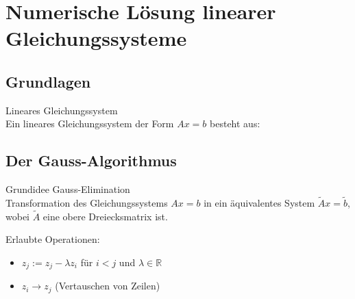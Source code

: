 \section{Numerische Lösung linearer Gleichungssysteme}

\subsection{Grundlagen}

\begin{concept}{Lineares Gleichungssystem}\\
Ein lineares Gleichungssystem der Form $Ax = b$ besteht aus:
\vspace{2mm}\\
\end{concept}

\subsection{Der Gauss-Algorithmus}

\begin{concept}{Grundidee Gauss-Elimination}\\
Transformation des Gleichungssystems $Ax=b$ in ein äquivalentes System $\tilde{A}x=\tilde{b}$, wobei $\tilde{A}$ eine obere Dreiecksmatrix ist.

Erlaubte Operationen:
\begin{itemize}
    \item $z_j := z_j - \lambda z_i$ für $i<j$ und $\lambda \in \mathbb{R}$
    \item $z_i \rightarrow z_j$ (Vertauschen von Zeilen)
\end{itemize}
\end{concept}

